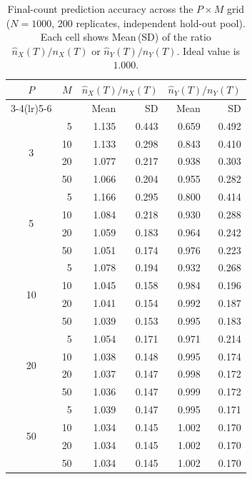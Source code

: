 \documentclass[12pt]{article}
\begin{document}
\begin{table}[H]
\centering
\caption{Final-count prediction accuracy across the $P \times M$ grid
         ($N=1000$, 200 replicates, independent hold-out pool).
         Each cell shows Mean\,(SD) of the ratio
         $\hat{n}_X(T)/n_X(T)$ or $\hat{n}_Y(T)/n_Y(T)$.
         Ideal value is $1.000$.}
\label{tab:pm_counts}
\begin{tabular}{crrrrr}
\toprule
$P$ & $M$ &
  \multicolumn{2}{c}{$\hat{n}_X(T)/n_X(T)$} &
  \multicolumn{2}{c}{$\hat{n}_Y(T)/n_Y(T)$} \\
\cmidrule(lr){3-4}\cmidrule(lr){5-6}
& & Mean & SD & Mean & SD \\
\midrule
\multirow{4}{*}{3}
 &  5 & 1.135 & 0.443 & 0.659 & 0.492 \\
 & 10 & 1.133 & 0.298 & 0.843 & 0.410 \\
 & 20 & 1.077 & 0.217 & 0.938 & 0.303 \\
 & 50 & 1.066 & 0.204 & 0.955 & 0.282 \\
\midrule
\multirow{4}{*}{5}
 &  5 & 1.166 & 0.295 & 0.800 & 0.414 \\
 & 10 & 1.084 & 0.218 & 0.930 & 0.288 \\
 & 20 & 1.059 & 0.183 & 0.964 & 0.242 \\
 & 50 & 1.051 & 0.174 & 0.976 & 0.223 \\
\midrule
\multirow{4}{*}{10}
 &  5 & 1.078 & 0.194 & 0.932 & 0.268 \\
 & 10 & 1.045 & 0.158 & 0.984 & 0.196 \\
 & 20 & 1.041 & 0.154 & 0.992 & 0.187 \\
 & 50 & 1.039 & 0.153 & 0.995 & 0.183 \\
\midrule
\multirow{4}{*}{20}
 &  5 & 1.054 & 0.171 & 0.971 & 0.214 \\
 & 10 & 1.038 & 0.148 & 0.995 & 0.174 \\
 & 20 & 1.037 & 0.147 & 0.998 & 0.172 \\
 & 50 & 1.036 & 0.147 & 0.999 & 0.172 \\
\midrule
\multirow{4}{*}{50}
 &  5 & 1.039 & 0.147 & 0.995 & 0.171 \\
 & 10 & 1.034 & 0.145 & 1.002 & 0.170 \\
 & 20 & 1.034 & 0.145 & 1.002 & 0.170 \\
 & 50 & 1.034 & 0.145 & 1.002 & 0.170 \\
\bottomrule
\end{tabular}
\end{table}
\end{document}
